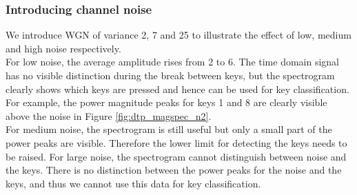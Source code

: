 \documentclass{article}
\begin{document}
\pagebreak

\subsubsection{Introducing channel noise}

We introduce WGN of variance 2, 7 and 25 to illustrate the effect of low, medium and high noise respectively.\\

For low noise, the average amplitude rises from 2 to 6. The time domain signal has no visible distinction during the break between keys, but the spectrogram clearly shows which keys are pressed and hence can be used for key classification. For example, the power magnitude peaks for keys 1 and 8 are clearly visible above the noise in Figure \ref{fig:dtp_magspec_n2}.\\

For medium noise, the spectrogram is still useful but only a small part of the power peaks are visible. Therefore the lower limit for detecting the keys needs to be raised. For large noise, the spectrogram cannot distinguish between noise and the keys. There is no distinction between the power peaks for the noise and the keys, and thus we cannot use this data for key classification.
\end{document}
